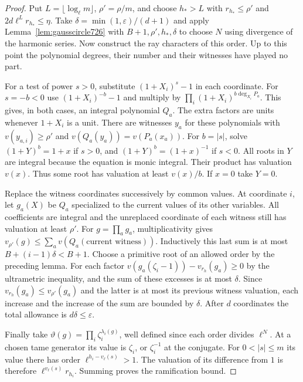 \documentclass[a4paper,11pt]{article}
\theoremstyle{definition}
\theoremstyle{remark}
\numberwithin{equation}{section}
\begin{document}
\begin{proof}
Put \(L=\lfloor\log_\ell m\rfloor\), \(\rho'=\rho/m\), and choose
\(h_*>L\) with \(r_{h_*}\le\rho'\) and \(2d\ell^Lr_{h_*}\le\eta\).
Take \(\delta=\min(1,\varepsilon)/(d+1)\) and apply
Lemma~\ref{lem:gausscircle726} with \(B+1,\rho',h_*,\delta\) to
choose \(N\) using divergence of the harmonic series. Now construct the ray
characters of this order. Up to this point the polynomial degrees,
their number and their witnesses have played no part.

For a test of power \(s>0\), substitute \((1+X_i)^s-1\) in each
coordinate. For \(s=-b<0\) use \((1+X_i)^{-b}-1\) and multiply by
\(\prod_i(1+X_i)^{b\deg_{X_i}P_a}\). This gives, in both cases, an
integral polynomial \(Q_a\). The extra factors are units whenever
\(1+X_i\) is a unit. There are witnesses \(y_a\) for these polynomials
with \(v(y_{a,i})\ge\rho'\) and \(v(Q_a(y_a))=v(P_a(x_a))\).
For \(b=|s|\), solve \((1+Y)^b=1+x\) if \(s>0\), and
\((1+Y)^b=(1+x)^{-1}\) if \(s<0\). All roots in \(Y\) are integral
because the equation is monic integral. Their product has valuation
\(v(x)\). Thus some root has valuation at least \(v(x)/b\). If \(x=0\)
take \(Y=0\).

Replace the witness coordinates successively by common values. At
coordinate \(i\), let \(g_a(X)\) be \(Q_a\) specialized to the current
values of its other variables. All coefficients are integral and the
unreplaced coordinate of each witness still has valuation at least
\(\rho'\). For \(g=\prod_a g_a\), multiplicativity gives
\(v_{\rho'}(g)\le\sum_a v(Q_a(\text{current witness}))\).
Inductively this last sum is at most \(B+(i-1)\delta<B+1\).
Choose a primitive root of an allowed order by the preceding lemma.
For each factor \(v(g_a(\zeta_i-1))-v_{r_h}(g_a)\ge0\) by the
ultrametric inequality, and the sum of these excesses is at most
\(\delta\). Since \(v_{r_h}(g_a)\le v_{\rho'}(g_a)\) and the latter
is at most its previous witness valuation, each increase and the
increase of the sum are bounded by \(\delta\). After \(d\) coordinates
the total allowance is \(d\delta\le\varepsilon\).

Finally take \(\vartheta(g)=\prod_i\zeta_i^{\lambda_i(g)}\), well
defined since each order divides \(\ell^N\). At a chosen tame generator
its value is \(\zeta_i\), or \(\zeta_i^{-1}\) at the conjugate. For
\(0<|s|\le m\) its value there has order \(\ell^{h_i-v_\ell(s)}>1\).
The valuation of its difference from \(1\) is therefore
\(\ell^{v_\ell(s)}r_{h_i}\). Summing proves the ramification bound.
\end{proof}
\end{document}
